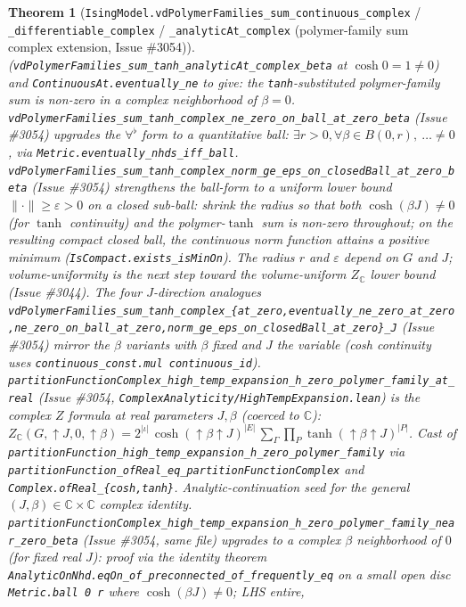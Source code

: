 \documentclass[a4paper,11pt]{article}
\newtheorem{theorem}{Theorem}
\begin{document}
\begin{theorem}[\texttt{IsingModel.vdPolymerFamilies\_sum\_continuous\_complex} /
\texttt{\_differentiable\_complex} / \texttt{\_analyticAt\_complex} (polymer-family sum
complex extension, Issue \#3054)]
(\texttt{vdPolymerFamilies\_sum\_tanh\_analyticAt\_complex\_beta} at
\(\cosh0=1\ne0\)) and \texttt{ContinuousAt.eventually\_ne} to give: the
\texttt{tanh}-substituted polymer-family sum is non-zero in a complex
neighborhood of \(\beta=0\).
\texttt{vdPolymerFamilies\_sum\_tanh\_complex\_ne\_zero\_on\_ball\_at\_zero\_beta}
(Issue \#3054) upgrades the \(\forall^\flat\) form to a quantitative ball:
\(\exists r>0,\forall\beta\in B(0,r),\ \dots\ne0\), via
\texttt{Metric.eventually\_nhds\_iff\_ball}.
\texttt{vdPolymerFamilies\_sum\_tanh\_complex\_norm\_ge\_eps\_on\_closedBall\_at\_zero\_beta}
(Issue \#3054) strengthens the ball-form to a uniform lower bound
\(\|\cdot\|\ge\varepsilon>0\) on a closed sub-ball: shrink the radius so that both
\(\cosh(\beta J)\ne0\) (for \(\tanh\) continuity) and the polymer-\(\tanh\) sum
is non-zero throughout; on the resulting compact closed ball, the continuous
norm function attains a positive minimum (\texttt{IsCompact.exists\_isMinOn}).
The radius \(r\) and \(\varepsilon\) depend on \(G\) and \(J\); volume-uniformity
is the next step toward the volume-uniform \(Z_{\mathbb{C}}\) lower bound
(Issue \#3044).
The four \(J\)-direction analogues
\texttt{vdPolymerFamilies\_sum\_tanh\_complex\_\{at\_zero,eventually\_ne\_zero\_at\_zero,ne\_zero\_on\_ball\_at\_zero,norm\_ge\_eps\_on\_closedBall\_at\_zero\}\_J}
(Issue \#3054) mirror the \(\beta\) variants with \(\beta\) fixed and \(J\) the
variable (cosh continuity uses \texttt{continuous\_const.mul continuous\_id}).
\texttt{partitionFunctionComplex\_high\_temp\_expansion\_h\_zero\_polymer\_family\_at\_real}
(Issue \#3054, \texttt{ComplexAnalyticity/HighTempExpansion.lean}) is the complex
\(Z\) formula at real parameters \(J,\beta\) (coerced to \(\mathbb{C}\)):
\(Z_{\mathbb{C}}(G,\uparrow J,0,\uparrow\beta)
=2^{|\iota|}\,\cosh(\uparrow\beta\uparrow J)^{|E|}\,
\sum_\Gamma\prod_P\tanh(\uparrow\beta\uparrow J)^{|P|}\).
Cast of \texttt{partitionFunction\_high\_temp\_expansion\_h\_zero\_polymer\_family}
via \texttt{partitionFunction\_ofReal\_eq\_partitionFunctionComplex} and
\texttt{Complex.ofReal\_\{cosh,tanh\}}. Analytic-continuation seed for the
general \((J,\beta)\in\mathbb{C}\times\mathbb{C}\) complex identity.
\texttt{partitionFunctionComplex\_high\_temp\_expansion\_h\_zero\_polymer\_family\_near\_zero\_beta}
(Issue \#3054, same file) upgrades to a complex \(\beta\) neighborhood of \(0\)
(for fixed real \(J\)): proof via the identity theorem
\texttt{AnalyticOnNhd.eqOn\_of\_preconnected\_of\_frequently\_eq} on a small
open disc \texttt{Metric.ball 0 r} where \(\cosh(\beta J)\ne0\); LHS entire,

\end{theorem}
\end{document}
